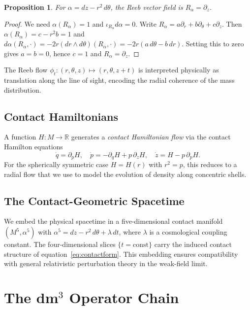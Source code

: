 \documentclass[11pt,a4paper,openright]{book}
\theoremstyle{dm3thm}
\newtheorem{proposition}[theorem]{Proposition}
\theoremstyle{dm3def}
\newcommand{\Ralf}{R_\alpha}
\begin{document}
\begin{proposition}
For $\alpha = dz - r^2\,d\theta$, the Reeb vector field is $\Ralf = \partial_z$.
\end{proposition}
\begin{proof}
We need $\alpha(\Ralf)=1$ and $\iota_{\Ralf}d\alpha=0$.
Write $\Ralf = a\partial_r + b\partial_\theta + c\partial_z$.
Then $\alpha(\Ralf) = c - r^2 b = 1$ and
$d\alpha(\Ralf,\cdot) = -2r(dr\wedge d\theta)(\Ralf,\cdot)
= -2r(a\,d\theta - b\,dr)$.
Setting this to zero gives $a=b=0$, hence $c=1$ and $\Ralf=\partial_z$.
\end{proof}

The Reeb flow $\phi_t: (r,\theta,z)\mapsto(r,\theta,z+t)$ is interpreted
physically as translation along the line of sight, encoding the radial
coherence of the mass distribution.

\section{Contact Hamiltonians}

A function $H: M\to\mathbb{R}$ generates a \emph{contact Hamiltonian flow}
via the contact Hamilton equations
\[
  \dot{q} = \partial_p H,\quad
  \dot{p} = -\partial_q H + p\,\partial_z H,\quad
  \dot{z} = H - p\,\partial_p H.
\]
For the spherically symmetric case $H = H(r)$ with $r^2 = p$, this reduces to
a radial flow that we use to model the evolution of density along concentric
shells.

\section{The Contact-Geometric Spacetime}

We embed the physical spacetime in a five-dimensional contact manifold
$(M^5, \alpha^5)$ with $\alpha^5 = dz - r^2\,d\theta + \lambda\,dt$, where
$\lambda$ is a cosmological coupling constant.  The four-dimensional slices
$\{t=\mathrm{const}\}$ carry the induced contact structure of
equation~\eqref{eq:contactform}.  This embedding ensures compatibility with
general relativistic perturbation theory in the weak-field limit.

\chapter{The dm$^3$ Operator Chain}
\label{ch:operators}
\end{document}
